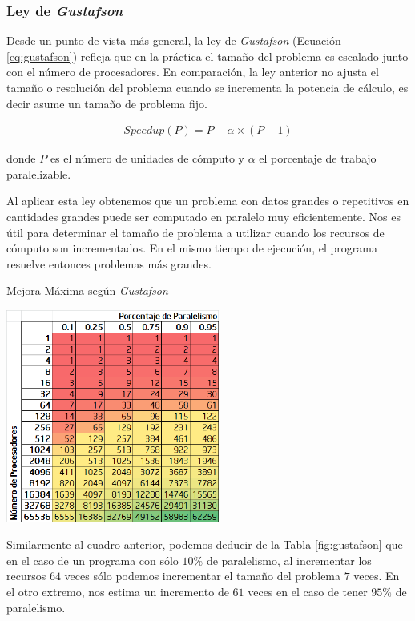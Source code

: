 \documentclass[a4paper]{report}
\begin{document}
\subsubsection{Ley de {\it Gustafson}}

Desde un punto de vista más general, la ley de {\it Gustafson} \cite{gustafson} (Ecuación \ref{eq:gustafson}) refleja que en la práctica el tamaño del problema es escalado junto con el número de procesadores. En comparación, la ley anterior no ajusta el tamaño o resolución del problema cuando se incrementa la potencia de cálculo, es decir asume un tamaño de problema fijo. 

\begin{eqnarray}
\label{eq:gustafson}
Speedup(P) = P - \alpha \times (P - 1)
\end{eqnarray}

donde $ P $ es el número de unidades de cómputo y $ \alpha $ el porcentaje de trabajo paralelizable.

\bigskip

Al aplicar esta ley obtenemos que un problema con datos grandes o repetitivos en cantidades grandes puede ser computado en paralelo muy eficientemente.
Nos es útil para determinar el tamaño de problema a utilizar cuando los recursos de cómputo son incrementados. 
En el mismo tiempo de ejecución, el programa resuelve entonces problemas más grandes.

\begin{table}[H]
\caption{Mejora Máxima según {\it Gustafson}}
\centering
\includegraphics[width=7cm]{gustafson.png}
\label{fig:gustafson}
\end{table}

Similarmente al cuadro anterior, podemos deducir de la Tabla \ref{fig:gustafson} que en el caso de un programa con sólo $ 10\% $ de paralelismo, al incrementar los recursos $ 64 $ veces sólo podemos incrementar el tamaño del problema $ 7 $ veces. En el otro extremo, nos estima un incremento de $ 61 $ veces en el caso de tener $ 95\% $ de paralelismo.
\end{document}
